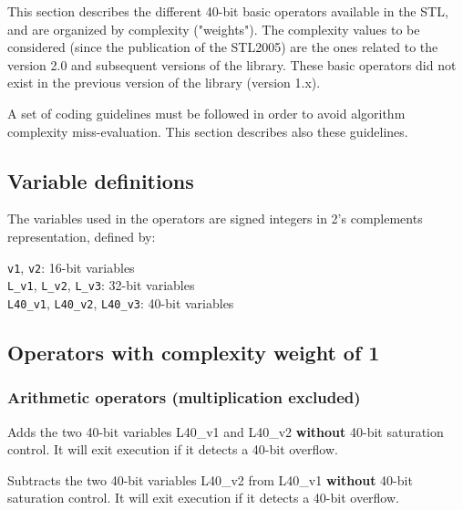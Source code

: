 This section describes the different 40-bit basic operators
available in the STL, and are organized by complexity ("weights").
The complexity values to be considered (since the publication of
the STL2005) are the ones related to the version 2.0 and subsequent versions of the library. These basic operators did not exist in the previous
version of the library (version 1.x).

A set of coding guidelines must be followed in order to avoid
algorithm complexity miss-evaluation. This section describes also
these guidelines.

\subsection{Variable definitions}

The variables used in the operators are signed integers in 2's
complements representation, defined by:

{\tt v1}, {\tt v2}: 16-bit variables\\
{\tt L\_v1}, {\tt L\_v2}, {\tt L\_v3}: 32-bit variables\\
{\tt L40\_v1}, {\tt L40\_v2}, {\tt L40\_v3}: 40-bit variables\\

\subsection{Operators with complexity weight of 1}
\subsubsection{Arithmetic operators (multiplication excluded)}


Adds the two 40-bit variables L40\_v1 and L40\_v2 \textbf{without}
40-bit saturation control. It will exit execution if it detects a 40-bit overflow.



Subtracts the two 40-bit variables L40\_v2 from L40\_v1
\textbf{without} 40-bit saturation control.
It will exit execution if it detects a 40-bit overflow.



